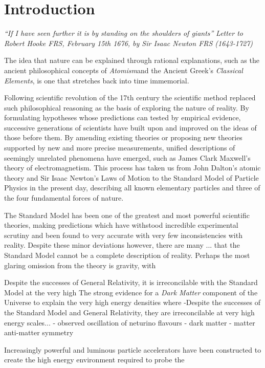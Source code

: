 \chapter{Introduction}\label{chapter:intro}

\emph{``If I have seen further it is by standing on the shoulders of giants''}
\emph{Letter to Robert Hooke FRS, February 15th 1676, by Sir Isaac Newton FRS (1643-1727)}

The idea that nature can be explained through rational explanations, such as the ancient philosophical concepts of \emph{Atomism}and the Ancient Greek's \emph{Classical Elements}, is one that stretches back into time immemorial.

Following scientific revolution of the 17th century the scientific method replaced such philosophical reasoning as the basis of exploring the nature of reality.
By formulating hypotheses whose predictions can tested by empirical evidence, successive generations of scientists
have built upon and improved on the ideas of those before them.
By amending existing theories or proposing new theories supported by new and more precise measurements, unified descriptions of seemingly unrelated phenomena have emerged, such as James Clark Maxwell's theory of electromagnetism.
This process has taken us from John Dalton's atomic theory and Sir Isaac Newton's Laws of Motion to the Standard Model of Particle Physics in the present day, describing all known elementary particles and three of the four fundamental forces of nature.


The Standard Model has been one of the greatest and most powerful scientific theories, making predictions which have withstood incredible experimental scrutiny and been found to very accurate with very few inconsistencies with reality.
Despite these minor deviations however, there are many ... that the Standard Model cannot be a complete description of reality.
Perhaps the most glaring omission from the theory is gravity, with 

Despite the successes of General Relativity, it is irreconcilable with the Standard Model at the very high 
The strong evidence for a \emph{Dark Matter} component of the Universe to explain the 
very high energy densities where 
-Despite the successes of the Standard Model and General Relativity, they are irreconcilable at very high energy scales...
- observed oscillation of neturino flavours
- dark matter
- matter anti-matter symmetry


Increasingly powerful and luminous particle accelerators have been constructed to create the high energy environment required to probe the 

